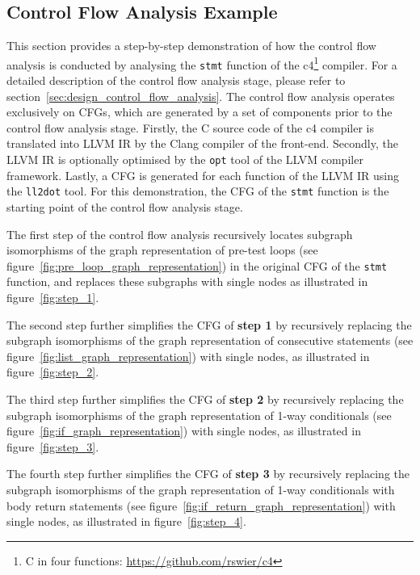 
\subsection{Control Flow Analysis Example}
\label{app:control_flow_analysis_example}

This section provides a step-by-step demonstration of how the control flow analysis is conducted by analysing the \texttt{stmt} function of the c4\footnote{C in four functions: \url{https://github.com/rswier/c4}} compiler. For a detailed description of the control flow analysis stage, please refer to section~\ref{sec:design_control_flow_analysis}. The control flow analysis operates exclusively on CFGs, which are generated by a set of components prior to the control flow analysis stage. Firstly, the C source code of the c4 compiler is translated into LLVM IR by the Clang compiler of the front-end. Secondly, the LLVM IR is optionally optimised by the \texttt{opt} tool of the LLVM compiler framework. Lastly, a CFG is generated for each function of the LLVM IR using the \texttt{ll2dot} tool. For this demonstration, the CFG of the \texttt{stmt} function is the starting point of the control flow analysis stage.

The first step of the control flow analysis recursively locates subgraph isomorphisms of the graph representation of pre-test loops (see figure~\ref{fig:pre_loop_graph_representation}) in the original CFG of the \texttt{stmt} function, and replaces these subgraphs with single nodes as illustrated in figure~\ref{fig:step_1}.

The second step further simplifies the CFG of \textbf{step 1} by recursively replacing the subgraph isomorphisms of the graph representation of consecutive statements (see figure~\ref{fig:list_graph_representation}) with single nodes, as illustrated in figure~\ref{fig:step_2}.

The third step further simplifies the CFG of \textbf{step 2} by recursively replacing the subgraph isomorphisms of the graph representation of 1-way conditionals (see figure~\ref{fig:if_graph_representation}) with single nodes, as illustrated in figure~\ref{fig:step_3}.

The fourth step further simplifies the CFG of \textbf{step 3} by recursively replacing the subgraph isomorphisms of the graph representation of 1-way conditionals with body return statements (see figure~\ref{fig:if_return_graph_representation}) with single nodes, as illustrated in figure~\ref{fig:step_4}.

